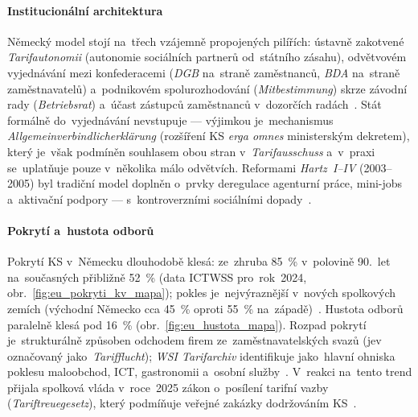 
\paragraph{Institucionální architektura}\label{par:de_architektura}

Německý model stojí na~třech vzájemně propojených pilířích: ústavně
zakotvené \emph{Tarifautonomii} (autonomie sociálních partnerů od~státního
zásahu), odvětvovém vyjednávání mezi konfederacemi (\textit{DGB} na~straně
zaměstnanců, \textit{BDA} na~straně zaměstnavatelů) a~podnikovém
spolurozhodování (\textit{Mitbestimmung}) skrze závodní rady
(\textit{Betriebsrat}) a~účast zástupců zaměstnanců v~dozorčích
radách~\cite{Hala_SystemySocialnihoDialogu2013}\cite{Petricek_PS2_NemeckyModel_2019}.
Stát formálně do~vyjednávání nevstupuje --- výjimkou je~mechanismus
\textit{Allgemeinverbindlicherklärung} (rozšíření \acs{KS} \emph{erga omnes}
ministerským dekretem), který je~však podmíněn souhlasem obou stran v~\textit{Tarifausschuss}
a~v~praxi se~uplatňuje pouze v~několika málo odvětvích. Reformami
\emph{Hartz~I--IV} (2003--2005) byl tradiční model doplněn o~prvky
deregulace agenturní práce, mini-jobs a~aktivační podpory --- s~kontroverzními
sociálními dopady~\cite{Petricek_PS2_NemeckyModel_2019}.

\paragraph{Pokrytí  a~hustota odborů}\label{par:de_pokryti}

Pokrytí \acs{KS} v~Německu dlouhodobě klesá: ze~zhruba \SI{85}{\percent}
v~polovině 90.~let na~současných přibližně \SI{52}{\percent} (data \acs{ICTWSS}
pro~rok~2024, obr.~\ref{fig:eu_pokryti_kv_mapa}); pokles je~nejvýraznější
v~nových spolkových zemích (východní Německo cca \SI{45}{\percent} oproti
\SI{55}{\percent} na~západě)~\cite{Schulten_WSI_Tarifstaerkung_2024}\cite{OECD_UnionEmployerCoverage_2025}.
Hustota odborů paralelně klesá pod \SI{16}{\percent} (obr.~\ref{fig:eu_hustota_mapa}).
Rozpad pokrytí je~strukturálně způsoben odchodem firem ze~zaměstnavatelských
svazů (jev označovaný jako~\textit{Tarifflucht}); \textit{WSI Tarifarchiv}
identifikuje jako~hlavní ohniska poklesu maloobchod, ICT, gastronomii
a~osobní služby~\cite{Schulten_WSI_Tarifstaerkung_2024}. V~reakci na~tento
trend přijala spolková vláda v~roce~2025 zákon o~posílení tarifní vazby
(\textit{Tariftreuegesetz}), který podmíňuje veřejné zakázky dodržováním
\acs{KS}~\cite{Bundestag_EU6_013_26}.

